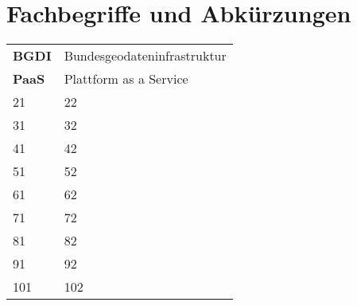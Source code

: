 \section{Fachbegriffe und Abkürzungen}
\begin{tabular}{ll}
    \textbf{BGDI} & Bundesgeodateninfrastruktur\\
	\textbf{PaaS} & Plattform as a Service\\
	21 & 22\\
	31 & 32\\
	41 & 42\\
	51 & 52\\
	61 & 62\\
	71 & 72\\
	81 & 82\\
	91 & 92\\
	101 & 102\\
\end{tabular}
